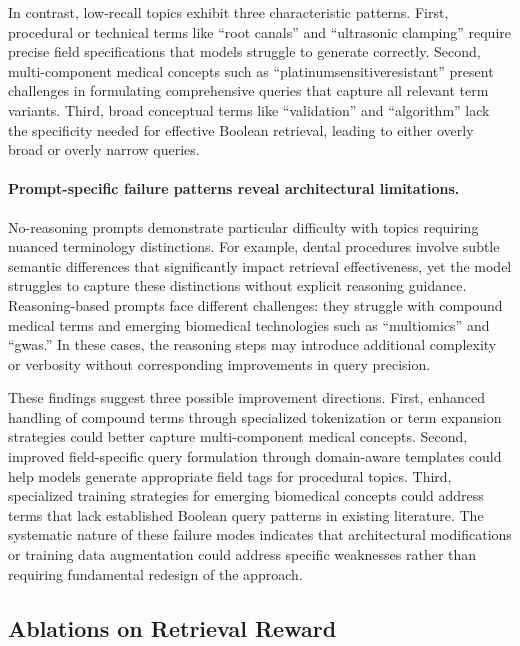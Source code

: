 In contrast, low-recall topics exhibit three characteristic patterns. First, procedural or technical terms like ``root canals'' and ``ultrasonic clamping'' require precise field specifications that models struggle to generate correctly. Second, multi-component medical concepts such as ``platinumsensitiveresistant'' present challenges in formulating comprehensive queries that capture all relevant term variants. Third, broad conceptual terms like ``validation'' and ``algorithm'' lack the specificity needed for effective Boolean retrieval, leading to either overly broad or overly narrow queries.

\paragraph{Prompt-specific failure patterns reveal architectural limitations.} No-reasoning prompts demonstrate particular difficulty with topics requiring nuanced terminology distinctions. For example, dental procedures involve subtle semantic differences that significantly impact retrieval effectiveness, yet the model struggles to capture these distinctions without explicit reasoning guidance. Reasoning-based prompts face different challenges: they struggle with compound medical terms and emerging biomedical technologies such as ``multiomics'' and ``gwas.'' In these cases, the reasoning steps may introduce additional complexity or verbosity without corresponding improvements in query precision.

These findings suggest three possible improvement directions. First, enhanced handling of compound terms through specialized tokenization or term expansion strategies could better capture multi-component medical concepts. Second, improved field-specific query formulation through domain-aware templates could help models generate appropriate field tags for procedural topics. Third, specialized training strategies for emerging biomedical concepts could address terms that lack established Boolean query patterns in existing literature. The systematic nature of these failure modes indicates that architectural modifications or training data augmentation could address specific weaknesses rather than requiring fundamental redesign of the approach.



\subsection{Ablations on Retrieval Reward}
\label{appendix:retrieval_reward}

